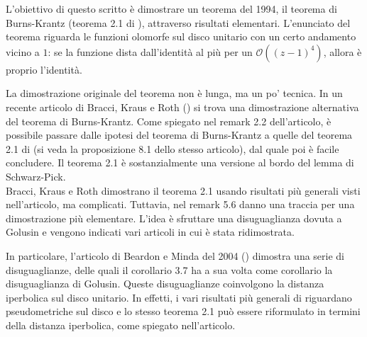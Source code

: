 L'obiettivo di questo scritto è dimostrare un teorema del 1994, il teorema di Burns-Krantz (teorema 2.1 di \cite{BK}), attraverso risultati elementari. L'enunciato del teorema riguarda le funzioni olomorfe sul disco unitario con un certo andamento vicino a $1$: se la funzione dista dall'identità al più per un $\mathcal{O}((z-1)^4)$, allora è proprio l'identità.

La dimostrazione originale del teorema non è lunga, ma un po' tecnica. In un recente articolo di Bracci, Kraus e Roth (\cite{BKR}) si trova una dimostrazione alternativa del teorema di Burns-Krantz. Come spiegato nel remark 2.2 dell'articolo, è possibile passare dalle ipotesi del teorema di Burns-Krantz a quelle del teorema 2.1 di \cite{BKR} (si veda la proposizione 8.1 dello stesso articolo), dal quale poi è facile concludere. Il teorema 2.1 è sostanzialmente una versione al bordo del lemma di Schwarz-Pick. \\

Bracci, Kraus e Roth dimostrano il teorema 2.1 usando risultati più generali visti nell'articolo, ma complicati. Tuttavia, nel remark 5.6 danno una traccia per una dimostrazione più elementare. L'idea è sfruttare una disuguaglianza dovuta a Golusin e vengono indicati vari articoli in cui è stata ridimostrata.

In particolare, l'articolo di Beardon e Minda del 2004 (\cite{BM}) dimostra una serie di disuguaglianze, delle quali il corollario 3.7 ha a sua volta come corollario la disuguaglianza di Golusin. Queste disuguaglianze coinvolgono la distanza iperbolica sul disco unitario. In effetti, i vari risultati più generali di \cite{BK} riguardano pseudometriche sul disco e lo stesso teorema 2.1 può essere riformulato in termini della distanza iperbolica, come spiegato nell'articolo.
